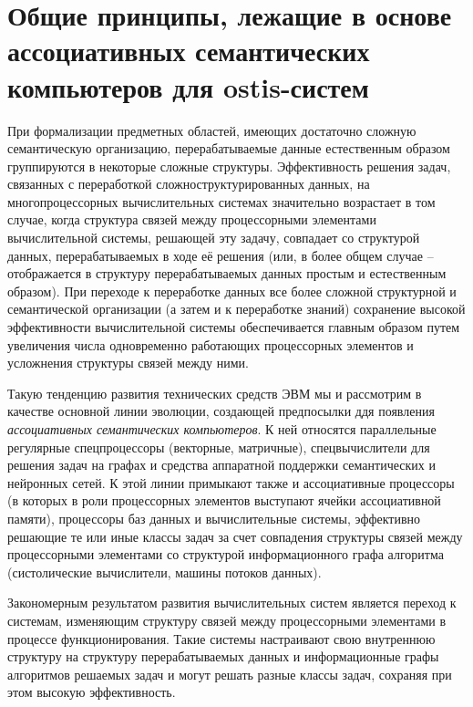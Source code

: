 \section{Общие принципы, лежащие в основе ассоциативных семантических компьютеров для ostis-систем}

При формализации предметных областей, имеющих достаточно сложную семантическую организацию, перерабатываемые данные естественным образом группируются в некоторые сложные структуры. Эффективность решения задач, связанных с переработкой сложноструктурированных данных, на многопроцессорных вычислительных системах значительно возрастает в том случае, когда структура связей между процессорными элементами вычислительной системы, решающей эту задачу, совпадает со структурой данных, перерабатываемых в ходе её решения (или, в более общем случае -- отображается в структуру перерабатываемых данных простым и естественным образом). При переходе к переработке данных все более сложной структурной и семантической организации (а затем и к переработке знаний) сохранение высокой эффективности вычислительной системы обеспечивается главным образом путем увеличения числа одновременно работающих процессорных элементов и усложнения структуры связей между ними.

Такую тенденцию развития технических средств ЭВМ мы и рассмотрим в качестве основной линии эволюции, создающей предпосылки ддя появления \textit{ассоциативных семантических компьютеров}. К ней относятся параллельные регулярные спецпроцессоры (векторные, матричные), спецвычислители для решения задач на графах и средства аппаратной поддержки семантических и нейронных сетей. К этой линии примыкают также и ассоциативные процессоры (в которых в роли процессорных элементов выступают ячейки ассоциативной памяти), процессоры баз данных и вычислительные системы, эффективно решающие те или иные классы задач за счет совпадения структуры связей между процессорными элементами со структурой информационного графа алгоритма (систолические вычислители, машины потоков данных).

Закономерным результатом развития вычислительных систем является переход к системам, изменяющим структуру связей между процессорными элементами в процессе функционирования. Такие системы настраивают свою внутреннюю структуру на структуру перерабатываемых данных и информационные графы алгоритмов решаемых задач и могут решать разные классы задач, сохраняя при этом высокую эффективность.

